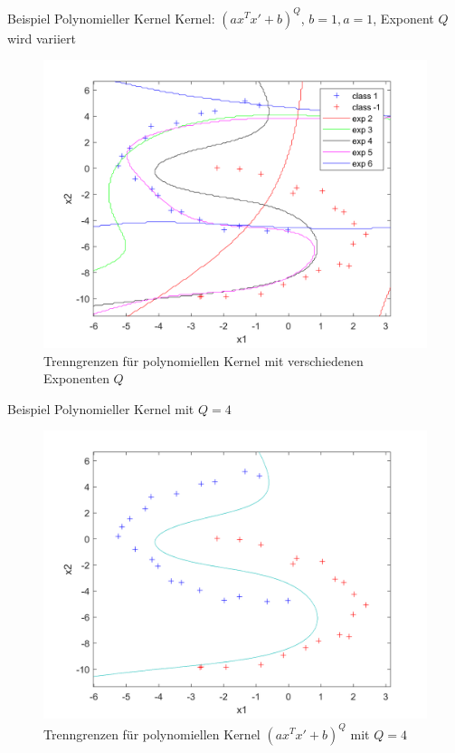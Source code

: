 \documentclass[ngerman]{beamer}
\begin{document}
\begin{frame}{Beispiel Polynomieller Kernel}
    Kernel: $(a x^{T}x' + b)^{Q}$, $b = 1, a = 1$, Exponent $Q$ wird variiert \\ \pause
        \begin{figure}
            \includegraphics[width=\textwidth,height=0.7\textheight,keepaspectratio]{../code/octave/images/kernelexptest}
            \caption{Trenngrenzen für polynomiellen Kernel mit verschiedenen Exponenten $Q$}
            \label{fig:bsppolykern}
        \end{figure}
\end{frame}

\begin{frame}{Beispiel Polynomieller Kernel mit $Q=4$}
    \begin{center}
        \begin{figure}
            \includegraphics[width=\textwidth,height=0.7\textheight,keepaspectratio]{../code/octave/images/sgddatasetkernelsolve}
            \caption{Trenngrenzen für polynomiellen Kernel $(a x^{T}x' + b)^{Q}$ mit $Q=4$}
            \label{fig:bsppolykernqfour}
        \end{figure}
    \end{center}
\end{frame}
\end{document}
